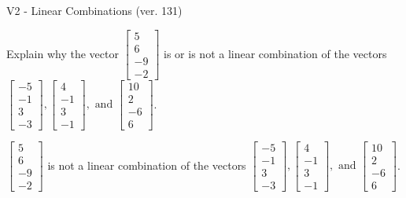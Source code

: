 \begin{exercise}
  \begin{exerciseTitle}V2 - Linear Combinations (ver. 131)\end{exerciseTitle}
  \begin{exerciseStatement}
    Explain why the vector \(\left[\begin{array}{c}
5 \\
6 \\
-9 \\
-2
\end{array}\right]\)  is or is not a linear 
	combination of the vectors \(\left[\begin{array}{c}
-5 \\
-1 \\
3 \\
-3
\end{array}\right] , \left[\begin{array}{c}
4 \\
-1 \\
3 \\
-1
\end{array}\right] , \text{ and } \left[\begin{array}{c}
10 \\
2 \\
-6 \\
6
\end{array}\right]\).
	


  \end{exerciseStatement}
  \begin{exerciseAnswer}
   \(\left[\begin{array}{c}
5 \\
6 \\
-9 \\
-2
\end{array}\right]\) 
  	 is not  
	a linear combination of the vectors \(\left[\begin{array}{c}
-5 \\
-1 \\
3 \\
-3
\end{array}\right] , \left[\begin{array}{c}
4 \\
-1 \\
3 \\
-1
\end{array}\right] , \text{ and } \left[\begin{array}{c}
10 \\
2 \\
-6 \\
6
\end{array}\right]\).

	
  


  \end{exerciseAnswer}
\end{exercise}
